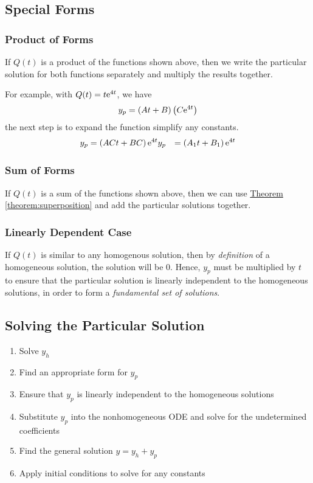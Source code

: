 \documentclass{article}
\begin{document}
\subsection{Special Forms}
\subsubsection{Product of Forms}
If $Q(t)$ is a product of the functions shown above, then we write the 
particular solution for both functions separately and multiply the results together.

For example, with $Q(t) = t \mathrm{e}^{4t}$, we have
\begin{equation*}
    y_p = \left(At + B\right) \left(C\mathrm{e}^{4t}\right)
\end{equation*}
the next step is to expand the function simplify any constants.
\begin{align*}
    y_p &= \left(ACt + BC\right) \mathrm{e}^{4t}
    y_p &= \left(A_1t + B_1\right) \mathrm{e}^{4t}
\end{align*}
\subsubsection{Sum of Forms}
If $Q(t)$ is a sum of the functions shown above, then we can use 
\hyperref[theorem:superposition]{Theorem \ref{theorem:superposition}}
and add the particular solutions together.
\subsubsection{Linearly Dependent Case}
If $Q(t)$ is similar to any homogenous solution, then by \textit{definition} of 
a homogeneous solution, the solution will be $0$. Hence, $y_p$ must be multiplied by $t$ 
to ensure that the particular solution is linearly independent to the homogeneous solutions,
in order to form a \textit{fundamental set of solutions}. 
\subsection{Solving the Particular Solution}
\begin{enumerate}
    \item Solve $y_h$
    \item Find an appropriate form for $y_p$
    \item Ensure that $y_p$ is linearly independent to the homogeneous solutions
    \item Substitute $y_p$ into the nonhomogeneous ODE and solve for the undetermined coefficients
    \item Find the general solution $y = y_h + y_p$
    \item Apply initial conditions to solve for any constants
\end{enumerate}
\end{document}
